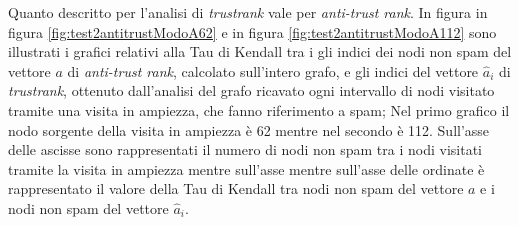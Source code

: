 Quanto descritto per l'analisi di \textit{trustrank} vale per \textit{anti-trust rank}. In figura in figura \ref{fig:test2antitrustModoA62} e in figura \ref{fig:test2antitrustModoA112} sono illustrati i grafici relativi alla Tau di Kendall tra i gli indici dei nodi non spam del vettore \(a\) di \textit{anti-trust rank}, calcolato sull'intero grafo, e gli indici  del vettore \(\hat{a}_i\) di \textit{trustrank}, ottenuto dall'analisi del grafo ricavato ogni intervallo di nodi visitato tramite una visita in ampiezza, che fanno riferimento a spam; Nel primo grafico il nodo sorgente della visita in ampiezza è 62 mentre nel secondo è 112. Sull'asse delle ascisse sono rappresentati il numero di nodi non spam tra i nodi visitati tramite la visita in ampiezza mentre sull'asse mentre sull'asse delle ordinate è rappresentato il valore della Tau di Kendall tra nodi non spam del vettore \(a\) e i nodi non spam del vettore \(\hat{a}_i\).
